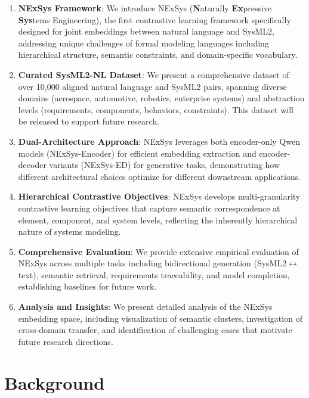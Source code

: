 \documentclass{article}
\begin{document}
\begin{enumerate}
\item \textbf{NExSys Framework}: We introduce NExSys (\textbf{N}aturally \textbf{Ex}pressive \textbf{Sys}tems Engineering), the first contrastive learning framework specifically designed for joint embeddings between natural language and SysML2, addressing unique challenges of formal modeling languages including hierarchical structure, semantic constraints, and domain-specific vocabulary.

\item \textbf{Curated SysML2-NL Dataset}: We present a comprehensive dataset of over 10,000 aligned natural language and SysML2 pairs, spanning diverse domains (aerospace, automotive, robotics, enterprise systems) and abstraction levels (requirements, components, behaviors, constraints). This dataset will be released to support future research.

\item \textbf{Dual-Architecture Approach}: NExSys leverages both encoder-only Qwen models (NExSys-Encoder) for efficient embedding extraction and encoder-decoder variants (NExSys-ED) for generative tasks, demonstrating how different architectural choices optimize for different downstream applications.

\item \textbf{Hierarchical Contrastive Objectives}: NExSys develops multi-granularity contrastive learning objectives that capture semantic correspondence at element, component, and system levels, reflecting the inherently hierarchical nature of systems modeling.

\item \textbf{Comprehensive Evaluation}: We provide extensive empirical evaluation of NExSys across multiple tasks including bidirectional generation (SysML2$\leftrightarrow$text), semantic retrieval, requirements traceability, and model completion, establishing baselines for future work.

\item \textbf{Analysis and Insights}: We present detailed analysis of the NExSys embedding space, including visualization of semantic clusters, investigation of cross-domain transfer, and identification of challenging cases that motivate future research directions.
\end{enumerate}

\section{Background}
\label{sec:background}
\end{document}
